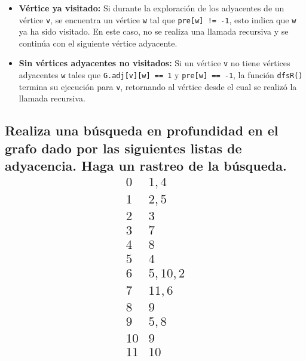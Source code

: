 \documentclass{article}
\begin{document}
        \begin{itemize}
            \item \textbf{Vértice ya visitado:} Si durante la exploración de los adyacentes de un vértice \texttt{v}, se encuentra un vértice \texttt{w} tal que \texttt{pre[w] != -1}, esto indica que \texttt{w} ya ha sido visitado. En este caso, no se realiza una llamada recursiva y se continúa con el siguiente vértice adyacente.
            
            \item \textbf{Sin vértices adyacentes no visitados:} Si un vértice \texttt{v} no tiene vértices adyacentes \texttt{w} tales que \texttt{G.adj[v][w] == 1} y \texttt{pre[w] == -1}, la función \texttt{dfsR()} termina su ejecución para \texttt{v}, retornando al vértice desde el cual se realizó la llamada recursiva.
        \end{itemize}

    \subsection{Realiza una búsqueda en profundidad en el grafo dado por las siguientes listas de adyacencia. Haga un rastreo de la búsqueda.
            \[
            \begin{array}{r|l}
            0  & 1, 4 \\
            1  & 2, 5 \\
            2  & 3 \\
            3  & 7 \\
            4  & 8 \\
            5  & 4 \\
            6  & 5, 10, 2 \\
            7  & 11, 6 \\
            8  & 9 \\
            9  & 5, 8 \\
            10 & 9 \\
            11 & 10 \\
            \end{array}
            \]
    }    
\end{document}
